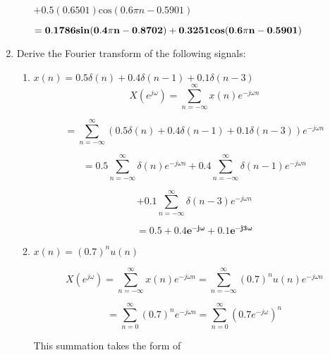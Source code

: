\documentclass[fleqn]{article}
\begin{document}
\begin{enumerate}[nolistsep]
\begin{enumerate}[nolistsep]
				$ + 0.5(0.6501)\text{cos}(0.6{\pi}n - 0.5901)$
				
				$ \mathbf{= 0.1786\text{\textbf{sin}}(0.4{\pi}n - 0.8702) + 0.3251\text{\textbf{cos}}(0.6{\pi}n - 0.5901)}$
		\end{enumerate}
		\item Derive the Fourier transform of the following signals:
		
			\begin{enumerate}[nolistsep]
				\item $x(n) = 0.5\delta(n) + 0.4\delta(n-1) + 0.1\delta(n-3)$
					\begin{equation*}
						X(e^{j\omega}) = \sum_{n=-\infty}^{\infty}x(n)e^{-j{\omega}n}
					\end{equation*}
					
					\begin{equation*}
						= \sum_{n=-\infty}^{\infty}(0.5\delta(n) + 0.4\delta(n-1) + 0.1\delta(n-3))e^{-j{\omega}n}
					\end{equation*}
					
					\begin{equation*}
						= 0.5\sum_{n=-\infty}^{\infty}\delta(n)e^{-j{\omega}n} + 0.4\sum_{n=-\infty}^{\infty}\delta(n-1)e^{-j{\omega}n}
					\end{equation*}
					
					\begin{equation*}
						 + 0.1\sum_{n=-\infty}^{\infty}\delta(n-3)e^{-j{\omega}n}
					\end{equation*}
					
					\begin{equation*}
						\mathbf{= 0.5 + 0.4e^{-j\omega} + 0.1e^{-j3\omega}}
					\end{equation*}
					 
				\item $x(n) = (0.7)^{n}u(n)$
				
					\begin{equation*}
						X(e^{j\omega}) = \sum_{n=-\infty}^{\infty}x(n)e^{-j{\omega}n} = \sum_{n=-\infty}^{\infty}(0.7)^{n}u(n)e^{-j{\omega}n}
					\end{equation*}
					
					\begin{equation*}
						= \sum_{n=0}^{\infty}(0.7)^{n}e^{-j{\omega}n} = \sum_{n=0}^{\infty}(0.7e^{-j{\omega}})^n
					\end{equation*}
					
					This summation takes the form of
					

\end{enumerate}
\end{enumerate}
\end{document}
